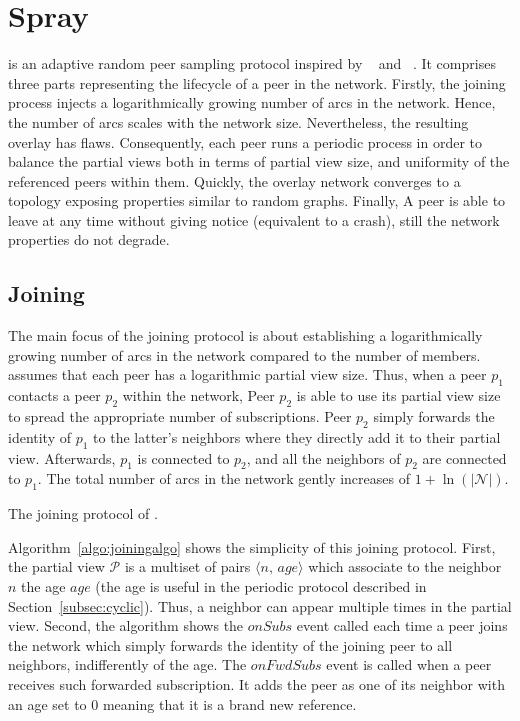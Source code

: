 
\section{Spray}
\label{sec:proposal}

\SCAMPLON{} \SCAMPLONDESCRIPTION{} is an adaptive random peer sampling protocol
inspired by \SCAMP{}~\cite{ganesh2003peer} and
\CYCLON{}~\cite{voulgaris2005cyclon}. It comprises three parts representing the
lifecycle of a peer in the network.  Firstly, the joining process injects a
logarithmically growing number of arcs in the network. Hence, the number of
arcs scales with the network size.  Nevertheless, the resulting overlay has
flaws. Consequently, each peer runs a periodic process in order to balance the
partial views both in terms of partial view size, and uniformity of the
referenced peers within them. Quickly, the overlay network converges to a
topology exposing properties similar to random graphs. Finally, A peer is able
to leave at any time without giving notice (equivalent to a crash), still the
network properties do not degrade.

\subsection{Joining}

The main focus of the joining protocol is about establishing a logarithmically
growing number of arcs in the network compared to the number of members.
\SCAMPLON{} assumes that each peer has a logarithmic partial view size. Thus,
when a peer $p_1$ contacts a peer $p_2$ within the network, Peer $p_2$ is able
to use its partial view size to spread the appropriate number of subscriptions.
Peer $p_2$ simply forwards the identity of $p_1$ to the latter's neighbors
where they directly add it to their partial view. Afterwards, $p_1$ is
connected to $p_2$, and all the neighbors of $p_2$ are connected to $p_1$. The
total number of arcs in the network gently increases of
$1+\ln(|\mathcal{N}|)$.

\begin{algorithm}[h]

\caption{\label{algo:joiningalgo}The joining protocol of \SCAMPLON{}.}
\end{algorithm}

Algorithm~\ref{algo:joiningalgo} shows the simplicity of this joining
protocol. First, the partial view $\mathcal{P}$ is a multiset of pairs
$\langle n,\, age\rangle$ which associate to the neighbor $n$ the age $age$
(the age is useful in the periodic protocol described in
Section~\ref{subsec:cyclic}). Thus, a neighbor can appear multiple times in the
partial view. Second, the algorithm shows the $onSubs$ event called each time a
peer joins the network which simply forwards the identity of the joining peer
to all neighbors, indifferently of the age. The $onFwdSubs$ event is called
when a peer receives such forwarded subscription. It adds the peer as one of
its neighbor with an age set to $0$ meaning that it is a brand new reference.


